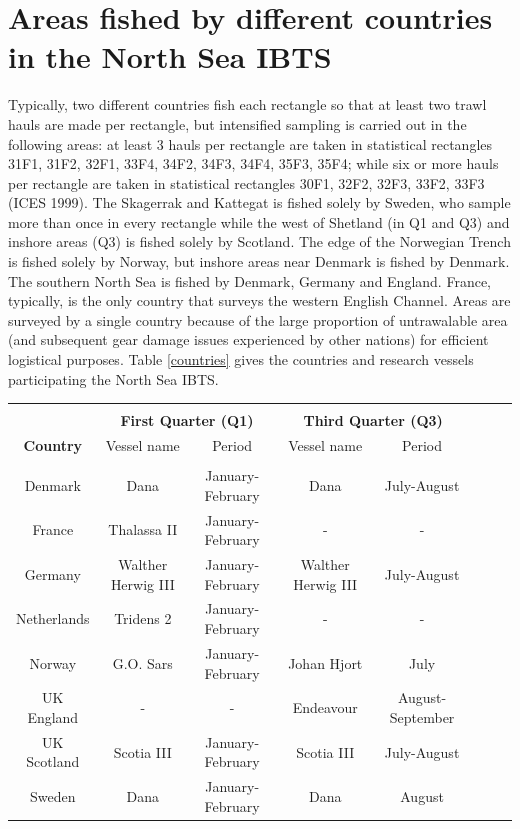 \documentclass[a4paper 12pt]{article}
\numberwithin{equation}{section}
\begin{document}
\section{\large Areas fished by different countries in the North Sea IBTS}
\label{secAp:areasfishedappendix}
Typically, two different countries fish each rectangle so that at least two trawl hauls are made per rectangle, but intensified sampling is carried out in the following areas: at least 3 hauls per rectangle are taken in statistical rectangles  31F1, 31F2, 32F1, 33F4, 34F2, 34F3, 34F4, 35F3, 35F4; while six or more hauls per rectangle are taken in statistical rectangles  30F1, 32F2, 32F3, 33F2, 33F3 (ICES 1999).  The Skagerrak and Kattegat is fished solely by Sweden, who sample more than once in every rectangle while the west of Shetland (in Q1 and Q3) and inshore areas (Q3) is fished solely by Scotland. The edge of the Norwegian Trench is fished solely by Norway, but inshore areas near Denmark is fished by Denmark. The southern North Sea is fished by Denmark, Germany and England. France, typically, is the only country that surveys the western English Channel. Areas are surveyed by a single country because of the large proportion of untrawalable area (and subsequent gear damage issues experienced by other nations)  for efficient logistical purposes. Table \ref{countries} gives the countries and research vessels participating the North Sea IBTS.\\
\begin{small}
\begin{table}[h!]
\centering
{}
\begin{tabular}{cccccccc}
\hline \\[0.1ex]
  & \multicolumn{2}{c}{\bf First Quarter (Q1)} & \multicolumn{2}{c}{\bf Third Quarter (Q3)}\\[1.5ex]
{\bf Country }  & Vessel name & Period    & Vessel name & Period  \\[0.5ex]
\hline \\[0.5ex]
Denmark  &   Dana   &   January-February  & Dana & July-August    \\[1ex]
France  & Thalassa II & January-February & - & -   \\[1ex]
Germany   &  Walther  Herwig III & January-February   &   Walther  Herwig III & July-August \\[1ex]
Netherlands &  Tridens 2 &  January-February   & - & -     \\[1ex]
Norway  &   G.O. Sars  & January-February &    Johan Hjort  & July   \\[1ex]
UK England &- & -&  Endeavour &  August-September  \\[1ex]
UK Scotland   &  Scotia III &  January-February & Scotia III &  July-August \\[1ex]
Sweden  &  Dana &  January-February  &  Dana &  August                  \\[0.5ex]
\hline
\end{tabular}
\end{table}
\end{small}
\end{document}

